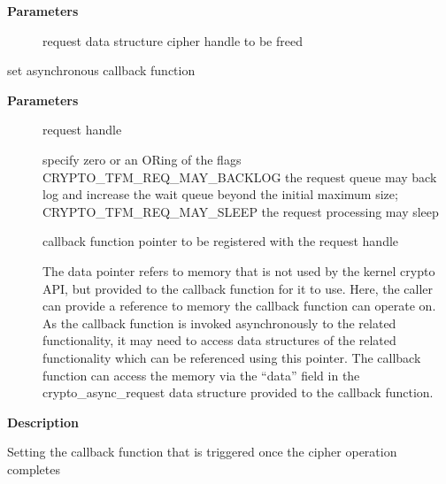 \documentclass[a4paper,8pt,english]{sphinxmanual}
\begin{document}
\textbf{Parameters}
\begin{description}
\item[{}] \leavevmode
request data structure cipher handle to be freed

\end{description}

\begin{fulllineitems}
\label{crypto/api-aead:c.aead_request_set_callback}
set asynchronous callback function

\end{fulllineitems}


\textbf{Parameters}
\begin{description}
\item[{}] \leavevmode
request handle

\item[{}] \leavevmode
specify zero or an ORing of the flags
CRYPTO\_TFM\_REQ\_MAY\_BACKLOG the request queue may back log and
increase the wait queue beyond the initial maximum size;
CRYPTO\_TFM\_REQ\_MAY\_SLEEP the request processing may sleep

\item[{}] \leavevmode
callback function pointer to be registered with the request handle

\item[{}] \leavevmode
The data pointer refers to memory that is not used by the kernel
crypto API, but provided to the callback function for it to use. Here,
the caller can provide a reference to memory the callback function can
operate on. As the callback function is invoked asynchronously to the
related functionality, it may need to access data structures of the
related functionality which can be referenced using this pointer. The
callback function can access the memory via the ``data'' field in the
crypto\_async\_request data structure provided to the callback function.

\end{description}

\textbf{Description}

Setting the callback function that is triggered once the cipher operation
completes
\end{document}
